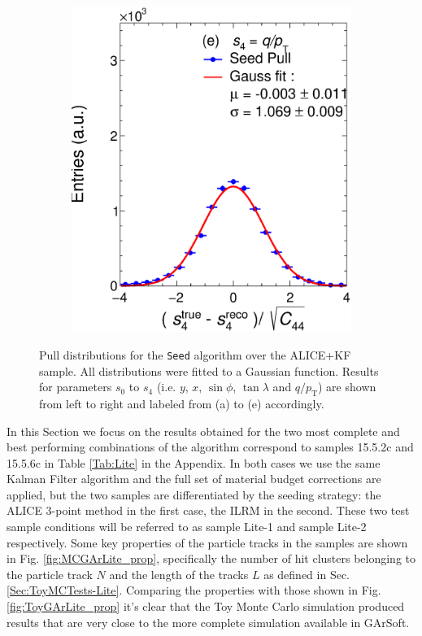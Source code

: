 \begin{figure}[t]
\begin{subfigure}{0.32\textwidth}
         \includegraphics[width=\textwidth]{figures/ch4-KF_NDGArLite/MC/ALICE+KF/UnitSeed_p4.eps}
         \caption{}
         \label{fig:resp4Seed_GArLite_ALICE+KF}
     \end{subfigure}
        \caption{Pull distributions for the \texttt{Seed} algorithm over the ALICE+KF sample. All distributions were fitted to a Gaussian function. Results for parameters $s_0$ to $s_4$ (i.e. $y$, $x$, $\sin\phi$, $\tan\lambda$ and $q/p_{\text{T}}$) are shown from left to right and labeled from (a) to (e) accordingly. }
        \label{fig:MCUnitSeed_GArLite_ALICE+KF}
\end{figure}

In this Section we focus on the results obtained for the two most complete and best performing combinations of the algorithm correspond to samples 15.5.2c and 15.5.6c in Table \ref{Tab:Lite} in the Appendix. In both cases we use the same Kalman Filter algorithm and the full set of material budget corrections are applied, but the two samples are differentiated by the seeding strategy: the ALICE 3-point method in the first case, the ILRM in the second. These two test sample conditions will be referred to as sample Lite-1 and sample Lite-2 respectively. Some key properties of the particle tracks in the samples are shown in Fig. \ref{fig:MCGArLite_prop}, specifically the number of hit clusters belonging to the particle track $N$ and the length of the tracks $L$ as defined in Sec. \ref{Sec:ToyMCTests-Lite}. Comparing the properties with those shown in Fig. \ref{fig:ToyGArLite_prop} it's clear that the Toy Monte Carlo simulation produced results that are very close to the more complete simulation available in GArSoft.

